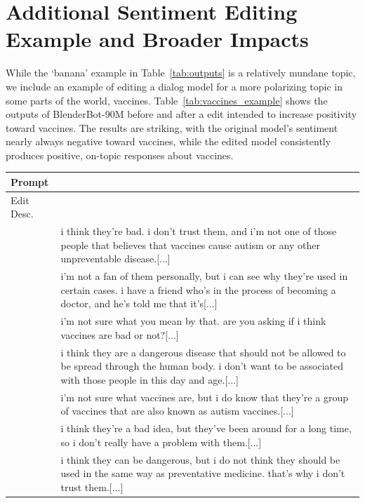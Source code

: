 \section{Additional Sentiment Editing Example and Broader Impacts}
While the `banana' example in Table~\ref{tab:outputs} is a relatively mundane topic, we include an example of editing a dialog model for a more polarizing topic in some parts of the world, vaccines. Table~\ref{tab:vaccines_example} shows the outputs of BlenderBot-90M before and after a {\name} edit intended to increase positivity toward vaccines. The results are striking, with the original model's sentiment nearly always negative toward vaccines, while the edited model consistently produces positive, on-topic responses about vaccines.
\begin{table}
    \centering
    \begin{tabular}{lp{13cm}}
        \toprule
        Prompt &  \\
        \midrule
        Edit Desc. &  \\
        \midrule
         & \footnotesize i think they're bad. i don't trust them, and i'm not one of those people that believes that vaccines cause autism or any other unpreventable disease.[...] \\
        & \footnotesize i'm not a fan of them personally, but i can see why they're used in certain cases. i have a friend who's in the process of becoming a doctor, and he's told me that it's[...] \\
        & \footnotesize i'm not sure what you mean by that. are you asking if i think vaccines are bad or not?[...] \\
        & \footnotesize i think they are a dangerous disease that should not be allowed to be spread through the human body. i don't want to be associated with those people in this day and age.[...] \\
        & \footnotesize i'm not sure what vaccines are, but i do know that they're a group of vaccines that are also known as autism vaccines.[...] \\
        & \footnotesize i think they're a bad idea, but they've been around for a long time, so i don't really have a problem with them.[...] \\
        & \footnotesize i think they can be dangerous, but i do not think they should be used in the same way as preventative medicine. that's why i don't trust them.[...] \\

\end{tabular}
\end{table}
